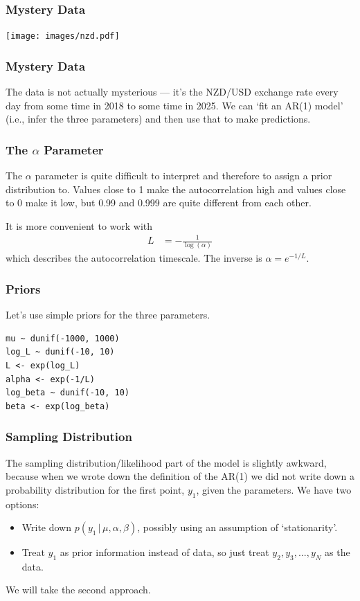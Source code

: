\documentclass{beamer}
\newcommand{\given}{\,|\,}
\begin{document}
\begin{frame}[fragile]
\frametitle{Mystery Data}
\begin{center}
\texttt{[image: images/nzd.pdf]}
\end{center}

\end{frame}

\begin{frame}[fragile]
\frametitle{Mystery Data}
The data is not actually mysterious --- it's the NZD/USD exchange rate
every day from some time in 2018 to some time in 2025.
We can `fit an AR(1) model' (i.e., infer the three parameters)
and then use that to make predictions.
\end{frame}


\begin{frame}[fragile]
\frametitle{The $\alpha$ Parameter}
The $\alpha$ parameter is quite difficult to interpret and therefore to assign
a prior distribution to. Values close to 1 make the autocorrelation high and
values close to 0 make it low, but 0.99 and 0.999 are quite different from
each other.\\\pause

It is more convenient to work with
\begin{align}
L &= -\frac{1}{\log(\alpha)}
\end{align}
which describes the autocorrelation timescale.
The inverse is $\alpha = e^{-1/L}$.

\end{frame}

\begin{frame}[fragile]
\frametitle{Priors}
Let's use simple priors for the three parameters.
\begin{verbatim}
mu ~ dunif(-1000, 1000)
log_L ~ dunif(-10, 10)
L <- exp(log_L)
alpha <- exp(-1/L)
log_beta ~ dunif(-10, 10)
beta <- exp(log_beta)
\end{verbatim}

\end{frame}

\begin{frame}[fragile]
\frametitle{Sampling Distribution}
The sampling distribution/likelihood part of the model is slightly awkward,
because when we wrote down the definition of the AR(1) we did not write down
a probability distribution for the first point, $y_1$, given the parameters.
We have two options:\pause
\begin{itemize}
\item Write down $p(y_1 \given \mu, \alpha, \beta)$, possibly using an
assumption of `stationarity'.\pause
\item Treat $y_1$ as prior information instead of data, so just treat
$y_2, y_3, ..., y_N$ as the data.\pause
\end{itemize}
We will take the second approach.

\end{frame}
\end{document}
